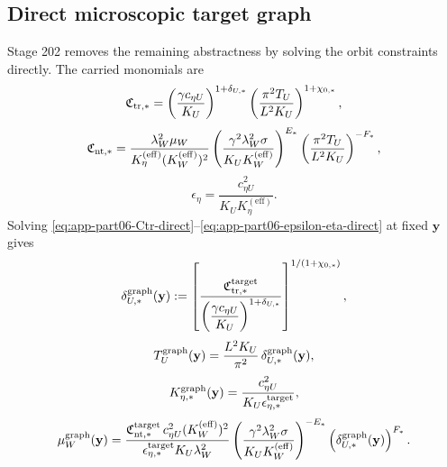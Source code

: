 \subsection{Direct microscopic target graph}
\label{subsec:app-part06-direct-target-graph}

Stage 202 removes the remaining abstractness by solving the orbit constraints directly.  The carried monomials are
\begin{equation}
\label{eq:app-part06-Ctr-direct}
\mathfrak C_{{\rm tr},*}
=
\left(\frac{\gamma c_{\eta U}}{K_U}\right)^{1+\delta_{U,*}}
\left(\frac{\pi^2T_U}{L^2K_U}\right)^{1+\chi_{0,*}},
\end{equation}
\begin{equation}
\label{eq:app-part06-Cnt-direct}
\mathfrak C_{{\rm nt},*}
=
\frac{\lambda_W^2\mu_W}{K_\eta^{(\mathrm{eff})}(K_W^{(\mathrm{eff})})^2}
\left(\frac{\gamma^2\lambda_W^2\sigma}{K_UK_W^{(\mathrm{eff})}}\right)^{E_*}
\left(\frac{\pi^2T_U}{L^2K_U}\right)^{-F_*},
\end{equation}
\begin{equation}
\label{eq:app-part06-epsilon-eta-direct}
\epsilon_\eta=\frac{c_{\eta U}^2}{K_UK_\eta^{(\mathrm{eff})}}.
\end{equation}
Solving \eqref{eq:app-part06-Ctr-direct}--\eqref{eq:app-part06-epsilon-eta-direct} at fixed \(\mathbf y\) gives
\begin{equation}
\label{eq:app-part06-deltaU-graph}
\delta_{U,*}^{\rm graph}(\mathbf y)
:=
\left[
\frac{\mathfrak C_{{\rm tr},*}^{\rm target}}
{\left(\dfrac{\gamma c_{\eta U}}{K_U}\right)^{1+\delta_{U,*}}}
\right]^{1/(1+\chi_{0,*})},
\end{equation}
\begin{equation}
\label{eq:app-part06-TU-graph}
T_U^{\rm graph}(\mathbf y)
=
\frac{L^2K_U}{\pi^2}\,\delta_{U,*}^{\rm graph}(\mathbf y),
\end{equation}
\begin{equation}
\label{eq:app-part06-Keta-graph}
K_{\eta,*}^{\rm graph}(\mathbf y)
=
\frac{c_{\eta U}^2}{K_U\epsilon_{\eta,*}^{\rm target}},
\end{equation}
\begin{equation}
\label{eq:app-part06-muW-graph}
\mu_W^{\rm graph}(\mathbf y)
=
\frac{\mathfrak C_{{\rm nt},*}^{\rm target}\,c_{\eta U}^2(K_W^{(\mathrm{eff})})^2}
{\epsilon_{\eta,*}^{\rm target}K_U\lambda_W^2}
\left(\frac{\gamma^2\lambda_W^2\sigma}{K_UK_W^{(\mathrm{eff})}}\right)^{-E_*}
\left(\delta_{U,*}^{\rm graph}(\mathbf y)\right)^{F_*}.
\end{equation}
